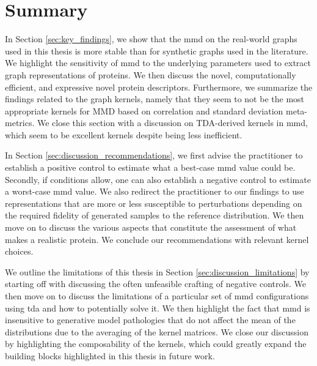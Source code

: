 \section{Summary}


In Section \ref{sec:key_findings}, we show that the \acrshort{mmd} on the
real-world graphs used in this thesis is more stable than for synthetic graphs
used in the literature. We highlight the sensitivity of \acrshort{mmd} to the
underlying parameters used to extract graph representations of proteins. We then
discuss the novel, computationally efficient, and expressive novel protein
descriptors. Furthermore, we summarize the findings related to the graph
kernels, namely that they seem to not be the most appropriate kernels for MMD based on
correlation and standard deviation meta-metrics. We close this section with a
discussion on TDA-derived kernels in \acrshort{mmd}, which seem to be excellent
kernels despite being less inefficient.

In Section \ref{sec:discussion_recommendations}, we first advise the
practitioner to establish a positive control to estimate what a best-case
\acrshort{mmd} value could be. Secondly, if conditions allow, one can also
establish a negative control to estimate a worst-case \acrshort{mmd} value. We
also redirect the practitioner to our findings to use representations that are
more or less susceptible to perturbations depending on the required fidelity of
generated samples to the reference distribution. We then move on to discuss the
various aspects that constitute the assessment of what makes a realistic
protein. We conclude our recommendations with relevant kernel choices.

We outline the limitations of this thesis in Section
\ref{sec:discussion_limitations} by starting off with discussing the often
unfeasible crafting of negative controls. We then move on to discuss the
limitations of a particular set of \acrshort{mmd} configurations using \acrshort{tda} and how to
potentially solve it. We then highlight the fact that \acrshort{mmd} is insensitive to
generative model pathologies that do not affect the mean of the distributions
due to the averaging of the kernel matrices. We close our discussion by
highlighting the composability of the kernels, which could greatly expand the
building blocks highlighted in this thesis in future work.
